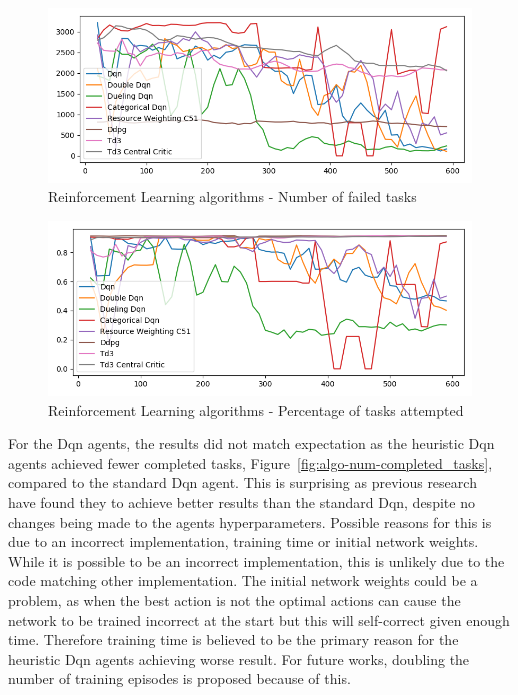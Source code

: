 \begin{figure}[H]
    \centering
    \includegraphics[width=\linewidth]{figures/5_evaluation_figs/algo_training_fig/num_failed_tasks.png}
    \caption{Reinforcement Learning algorithms - Number of failed tasks}
    \label{fig:algo-num-failed-tasks}
\end{figure}

\begin{figure}[H]
    \centering
    \includegraphics[width=\linewidth]{figures/5_evaluation_figs/algo_training_fig/percent_tasks.png}
    \caption{Reinforcement Learning algorithms - Percentage of tasks attempted}
    \label{fig:algo-percent-tasks}
\end{figure}

For the Dqn agents, the results did not match expectation as the heuristic Dqn agents achieved fewer completed tasks,
Figure~\ref{fig:algo-num-completed_tasks}, compared to the standard Dqn agent. This is surprising as previous
research~\citep{doubledqn, duelingdqn, rainbow} have found they to achieve better results than the standard Dqn,
despite no changes being made to the agents hyperparameters. Possible reasons for this is due to an incorrect
implementation, training time or initial network weights. While it is possible to be an incorrect implementation, this
is unlikely due to the code matching other implementation. The initial network weights could be a problem,
as when the best action is not the optimal actions can cause the network to be trained incorrect at the start but this
will self-correct given enough time. Therefore training time is believed to be the primary reason for the heuristic Dqn
agents achieving worse result. For future works, doubling the number of training episodes is proposed because of this.

